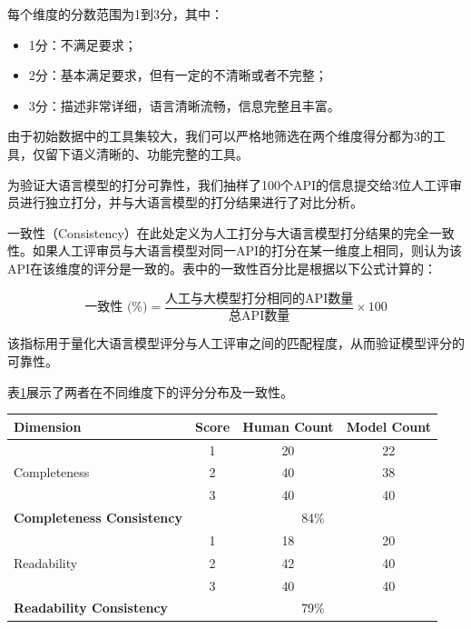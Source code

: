 每个维度的分数范围为1到3分，其中：
\begin{itemize}
    \item 1分：不满足要求；
    \item 2分：基本满足要求，但有一定的不清晰或者不完整；
    \item 3分：描述非常详细，语言清晰流畅，信息完整且丰富。
\end{itemize}

由于初始数据中的工具集较大，我们可以严格地筛选在两个维度得分都为3的工具，仅留下语义清晰的、功能完整的工具。

为验证大语言模型的打分可靠性，我们抽样了100个API的信息提交给3位人工评审员进行独立打分，并与大语言模型的打分结果进行了对比分析。

一致性（Consistency）在此处定义为人工打分与大语言模型打分结果的完全一致性。如果人工评审员与大语言模型对同一API的打分在某一维度上相同，则认为该API在该维度的评分是一致的。表中的一致性百分比是根据以下公式计算的：

\[
\text{一致性 (\%)} = \frac{\text{人工与大模型打分相同的API数量}}{\text{总API数量}} \times 100
\]

该指标用于量化大语言模型评分与人工评审之间的匹配程度，从而验证模型评分的可靠性。

表\ref{tab:api_score_comparison}展示了两者在不同维度下的评分分布及一致性。

\begin{table}[h]
  \centering
  \label{tab:api_score_comparison}
  \begin{tabular}{l|c|c|c}
  \toprule
  \textbf{Dimension} & \textbf{Score} & \textbf{Human Count} & \textbf{Model Count} \\ \midrule
  \multirow{3}{*}{Completeness} & 1 & 20 & 22 \\ 
                                & 2 & 40 & 38 \\ 
                                & 3 & 40 & 40 \\ \hline
  \textbf{Completeness Consistency} & \multicolumn{3}{c}{84\%} \\ \midrule
  \multirow{3}{*}{Readability}  & 1 & 18 & 20 \\ 
                                & 2 & 42 & 40 \\ 
                                & 3 & 40 & 40 \\ \hline
  \textbf{Readability Consistency} & \multicolumn{3}{c}{79\%} \\ 
  \bottomrule
  \end{tabular}
  \end{table}

